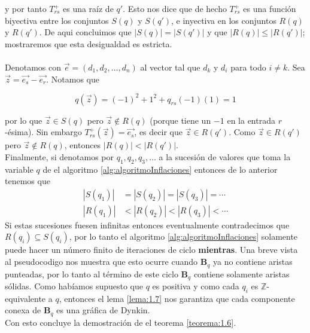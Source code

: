 y por tanto $T_{rs}^{+}$ es una raíz de $q'$. Esto nos dice que de hecho $T_{rs}^{+}$ es una función biyectiva entre los conjuntos $S\left(q\right)$ y $S\left(q'\right)$, e inyectiva en los conjuntos $R\left(q\right)$ y $R\left(q'\right)$. De aqui concluimos que $\left|S\left(q\right)\right| =  \left|S\left(q'\right)\right|$ y que $\left|R\left(q\right)\right| \leq \left|R\left(q'\right)\right|$; mostraremos que esta desigualdad es estricta.

\paragraph{}
Denotamos con $\overrightarrow{e} = \left(d_{1}, d_{2},\dots,d_{n}\right)$ al vector tal que $d_{k}$ y $d_{i}$ para todo $i \neq k$. Sea $\overrightarrow{z} = \overrightarrow{e_{s}} - \overrightarrow{e_{r}} $. Notamos que 

\begin{equation*}
q\left(\overrightarrow{z}\right) = \left(-1\right)^{2} + 1^{2} + q_{rs}(-1)(1) = 1
\end{equation*}

por lo que $\overrightarrow{z} \in S\left(q\right)$ pero $\overrightarrow{z} \notin R\left(q\right)$ (porque tiene un $-1$ en la entrada $r$-ésima). Sin embargo $T_{rs}^{+}\left(\overrightarrow{z}\right) = \overrightarrow{e_{s}}$, es decir que $\overrightarrow{z} \in R\left(q'\right)$. Como $\overrightarrow{z} \in R\left(q'\right)$ pero $\overrightarrow{z} \notin R\left(q\right)$, entonces $\left|R\left(q\right)\right| < \left|R\left(q'\right)\right|$.\\

Finalmente, si denotamos por $q_{1}, q_{2},q_{3},\ldots$ a la sucesión de valores que toma la variable $q$ de el algoritmo \ref{alg:algoritmoInflaciones} entonces de lo anterior tenemos que\\

\begin{equation*}
\begin{split}
\left|S(q_{1})\right| & = \left|S(q_{2})\right| = \left|S(q_{3})\right| = \cdots\\
\left|R(q_{1})\right| & < \left|R\left(q_{2}\right)\right| < \left|R\left(q_{3}\right)\right| < \cdots 
\end{split}
\end{equation*}
Si estas sucesiones fuesen infinitas entonces eventualmente contradecimos que $R\left(q_{i}\right) \subseteq S\left(q_{i}\right)$, por lo tanto el algoritmo \ref{alg:algoritmoInflaciones} solamente puede hacer un número finito de iteraciones de ciclo \textbf{mientras}. Una breve vista al pseudocodigo nos muestra que esto ocurre cuando $\textbf{B}_{q}$ ya no contiene aristas punteadas, por lo tanto al término de este ciclo $\textbf{B}_{q}$ contiene solamente aristas sólidas. Como habíamos supuesto que $q$ es positiva y como cada $q_{i}$ es $\mathbb{Z}$-equivalente a $q$, entonces el lema \ref{lema:1.7} nos garantiza que cada componente conexa de $\textbf{B}_{q}$ es una gráfica de Dynkin.\\
Con esto concluye la demostración de el teorema \ref{teorema:1.6}.

